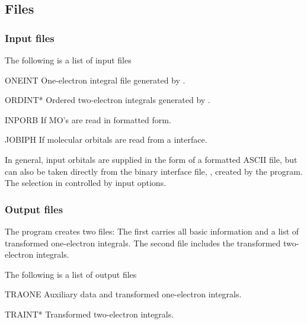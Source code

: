 \subsection{Files}
\label{UG:sec:motra_files}

\subsubsection{Input files}

The following is a list of input files
\begin{filelist}
\item[ONEINT]
One-{}electron integral file generated by .
\item[ORDINT*]
Ordered two-{}electron integrals generated by .
\item[INPORB]
If MO's are read in formatted form.
\item[JOBIPH]
If molecular orbitals are read from a  interface.
\end{filelist}
In general, input orbitals are supplied in the form of
a formatted ASCII file, but can also be taken directly from
the binary interface file, , created by the
 program. The selection in controlled by
input options.

\subsubsection{Output files}

The program 
creates two files: The first carries all basic information
and a list of transformed one-{}electron integrals. The second
file includes the transformed two-{}electron integrals.

The following is a list of output files
\begin{filelist}
\item[TRAONE]
Auxiliary data and transformed one-{}electron integrals.
\item[TRAINT*]
Transformed two-{}electron integrals.
\end{filelist}

%
%

